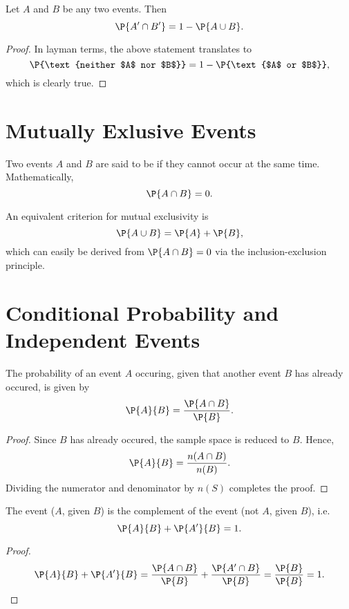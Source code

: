 \begin{proposition}
    Let $A$ and $B$ be any two events. Then \[\P{A' \cap B'} = 1 - \P{A \cup B}.\]
\end{proposition}
\begin{proof}
    In layman terms, the above statement translates to \[\P{\text{neither $A$ nor $B$}} = 1 - \P{\text{$A$ or $B$}},\] which is clearly true.
\end{proof}

\section{Mutually Exlusive Events}

\begin{definition}
    Two events $A$ and $B$ are said to be  if they cannot occur at the same time. Mathematically, \[\P{A \cap B} = 0.\]
\end{definition}

An equivalent criterion for mutual exclusivity is \[\P{A \cup B} = \P{A} + \P{B},\] which can easily be derived from $\P{A \cap B} = 0$ via the inclusion-exclusion principle.

\section{Conditional Probability and Independent Events}

\begin{proposition}
    The probability of an event $A$ occuring, given that another event $B$ has already occured, is given by \[\P{A}{B} = \frac{\P{A \cap B}}{\P{B}}.\]
\end{proposition}
\begin{proof}
    Since $B$ has already occured, the sample space is reduced to $B$. Hence, \[\P{A}{B} = \frac{n(A \cap B)}{n(B)}.\] Dividing the numerator and denominator by $n(S)$ completes the proof.
\end{proof}

\begin{corollary}
    The event ($A$, given $B$) is the complement of the event (not $A$, given $B$), i.e. \[\P{A}{B} + \P{A'}{B} = 1.\]
\end{corollary}
\begin{proof}
    \[\P{A}{B} + \P{A'}{B} = \frac{\P{A \cap B}}{\P{B}} + \frac{\P{A' \cap B}}{\P{B}} = \frac{\P{B}}{\P{B}} = 1.\]
\end{proof}

